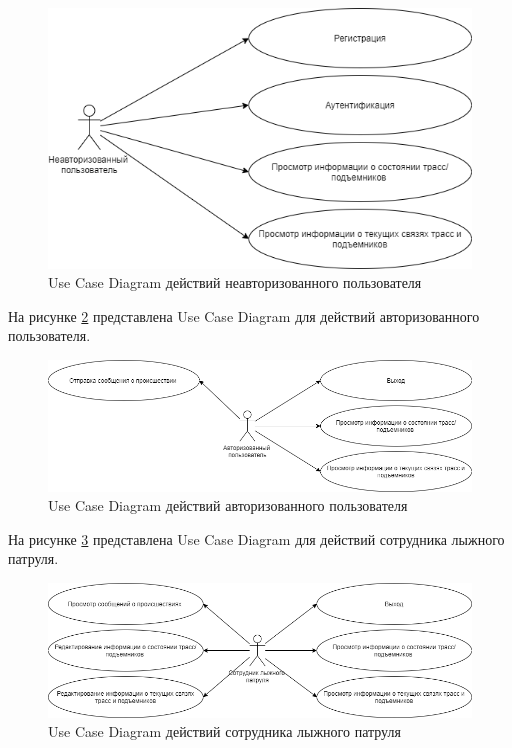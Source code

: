 \begin{figure}[h!]
	\begin{center}
		\includegraphics[scale=0.7]{../imgs/use_case/use-case1.png}
	\end{center}
	\captionsetup{justification=centering}
	\caption{Use Case Diagram действий неавторизованного пользователя}
	\label{img:use_case1}
\end{figure}


На рисунке \ref{img:use_case2} представлена Use Case Diagram для действий авторизованного пользователя.

\begin{figure}[h!]
	\begin{center}
		\includegraphics[scale=0.6]{../imgs/use_case/use-case2.png}
	\end{center}
	\captionsetup{justification=centering}
	\caption{Use Case Diagram действий авторизованного пользователя}
	\label{img:use_case2}
\end{figure}


\clearpage
На рисунке \ref{img:use_case3} представлена Use Case Diagram для действий сотрудника лыжного патруля.

\begin{figure}[h!]
	\begin{center}
		\includegraphics[scale=0.6]{../imgs/use_case/use-case3.png}
	\end{center}
	\captionsetup{justification=centering}
	\caption{Use Case Diagram действий сотрудника лыжного патруля}
	\label{img:use_case3}
\end{figure}


